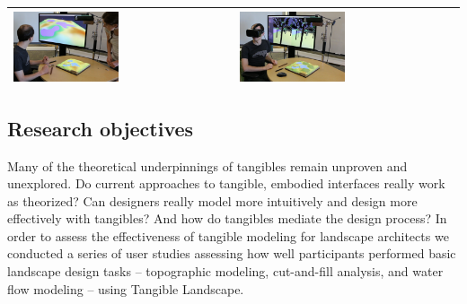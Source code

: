 \documentclass[Afour,sageh,times]{sagej}
\newcommand{\ra}[1]{\renewcommand{\arraystretch}{#1}}
\begin{document}
\begin{table}
\begin{tabular}{m{} m{}}
%
\includegraphics[width=0.49\textwidth]{images/immersive/sculpting_landforms_3.png} &
\includegraphics[width=0.49\textwidth]{images/immersive/trees_with_oculus_1.png}\\
%
\bottomrule
\end{tabular}
\label{table:tl_demo} 
\end{table}


\subsection{Research objectives}
Many of the theoretical underpinnings of tangibles 
remain unproven and unexplored. 
Do current approaches to tangible, embodied interfaces
really work as theorized? 
Can designers really model more intuitively and 
design more effectively with tangibles?
And how do tangibles mediate the design process?
%
In order to assess the effectiveness 
of tangible modeling for landscape architects 
we conducted a series of user studies
assessing how well participants performed
basic landscape design tasks 
-- topographic modeling, cut-and-fill analysis, and water flow modeling --
using Tangible Landscape.\\
\end{document}
